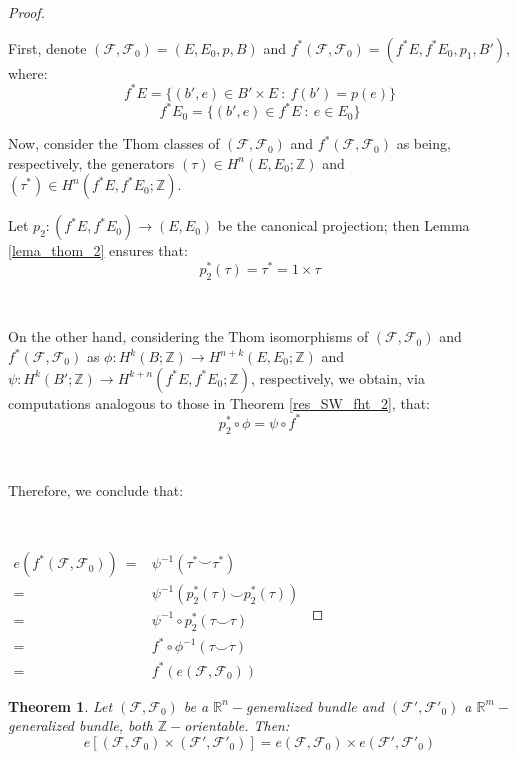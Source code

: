 \documentclass[12pt,oneside]{book}
\newtheorem{teo}    {Theorem}[chapter]
\newcommand{\R}{\mathbb{R}}
\newcommand{\Z}{\mathbb{Z}}
\newcommand{\ccup}{\smile}
\begin{document}
    \begin{proof}

        \

    	First, denote $(\mathcal{F},\mathcal{F}_{0})=(E,E_{0},p,B)$ and $f^{*}(\mathcal{F},\mathcal{F}_{0})=(f^{*}E,f^{*}E_{0},p_{1},B')$, 
        where:
    	$$f^{*}E=\{ (b',e)\in B'\times E \ : \ f(b')=p(e) \}$$
    	$$f^{*}E_{0}=\{ (b',e)\in f^{*}E \ : \ e\in E_{0} \}$$

    	Now, consider the Thom classes of $(\mathcal{F},\mathcal{F}_{0})$ and $f^{*}(\mathcal{F},\mathcal{F}_{0})$ as 
        being, respectively, the generators $(\tau)\in H^{n}(E,E_{0};\Z)$ and $(\tau^{*})\in H^{n}(f^{*}E,f^{*}E_{0};\Z)$.
        
        Let $p_{2}:(f^{*}E,f^{*}E_{0})\to (E,E_{0})$ be the canonical projection; then Lemma \ref{lema_thom_2} ensures that:
    	$$ p_{2}^{*}(\tau)=\tau^{*}=1\times\tau $$

        \

    	On the other hand, considering the Thom isomorphisms of $(\mathcal{F},\mathcal{F}_{0})$ and 
        $f^{*}(\mathcal{F},\mathcal{F}_{0})$ as $\phi:H^{k}(B;\Z)\to H^{n+k}(E,E_{0};\Z)$ and 
        $\psi:H^{k}(B';\Z)\to H^{k+n}(f^{*}E,f^{*}E_{0};\Z)$, respectively, we obtain, via computations analogous to those in 
        Theorem \ref{res_SW_fht_2}, that:
    	$$ p_{2}^{*}\circ \phi=\psi\circ f^{*} $$

        \

    	Therefore, we conclude that:

        \

    	$\begin{array}{rl}
    		e\left( f^{*}(\mathcal{F},\mathcal{F}_{0}) \right) \ = & \psi^{-1}(\tau^{*}\ccup\tau^{*}) \\
    		= & \psi^{-1}(p_{2}^{*}(\tau)\ccup p_{2}^{*}(\tau)) \\
    		= & \psi^{-1}\circ p_{2}^{*}(\tau\ccup\tau) \\
    		= & f^{*}\circ\phi^{-1}(\tau\ccup\tau) \\
    		= & f^{*}\left( e(\mathcal{F},\mathcal{F}_{0}) \right)
    	\end{array}$

    \end{proof}

    \begin{teo}\label{euler_prod}
	Let $(\mathcal{F},\mathcal{F}_{0})$ be a $\R^{n}-$generalized bundle and $(\mathcal{F'},\mathcal{F'}_{0})$ a $\R^{m}-$generalized bundle, 
    both $\Z-$orientable. Then:
	$$ e[(\mathcal{F},\mathcal{F}_{0})\times (\mathcal{F'},\mathcal{F'}_{0})]=e(\mathcal{F},\mathcal{F}_{0})\times e(\mathcal{F'},\mathcal{F'}_{0}) $$
    \end{teo}
\end{document}

